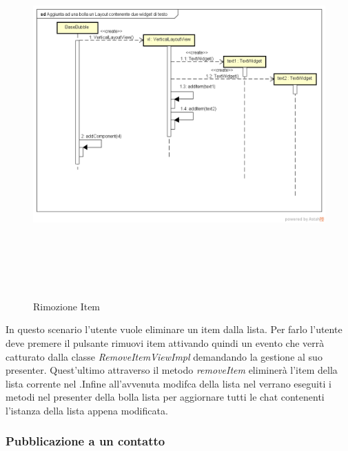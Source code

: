 \label{Rimozione Item }
\begin{figure}[ht]
	\centering
	\includegraphics[width=16cm, height=14cm]{Sezioni/Diagrammi/img/Aggiunta ad una bolla un Layout contenente due widget di testo.png}
	\caption{Rimozione Item}
	
\end{figure}
In questo scenario l'utente vuole eliminare un item dalla lista. Per farlo l'utente deve premere il pulsante rimuovi item attivando quindi un evento che verrà catturato dalla classe \textit{RemoveItemViewImpl} demandando la gestione al suo presenter. Quest'ultimo attraverso il metodo \textit{removeItem} eliminerà l'item della lista corrente nel .Infine all'avvenuta modifca della lista nel  verrano eseguiti i metodi nel presenter della bolla lista per aggiornare tutti le chat contenenti l'istanza della lista appena modificata.  
\newpage

\subsubsection{Pubblicazione a un contatto}

